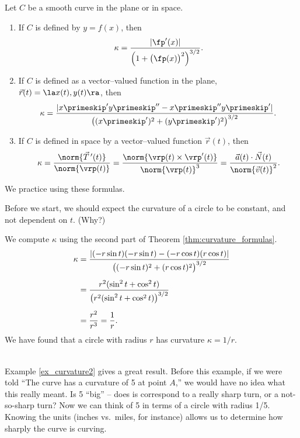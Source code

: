 {Let $C$ be a smooth curve  in the plane or in space.
\begin{enumerate}
	\item If $C$ is defined by $y=f(x)$, then 
	\[
	\kappa = \frac{\lvert\fp'(x)\rvert}{\Big(1+\big(\fp(x)\big)^2\Big)^{3/2}}.
	\]
	\item	If $C$ is defined as a vector--valued function in the plane, $\vec r(t) = \la x(t), y(t)\ra$, then
	\[
	\kappa = \frac{\lvert x\primeskip'y\primeskip''-x\primeskip''y\primeskip'\rvert}{\big((x\primeskip')^2+(y\primeskip')^2\big)^{3/2}}.
	\]
	\item If $C$ is defined in space by a vector--valued function $\vec r(t)$, then
\[
\kappa = \frac{\norm{\vec T\,'(t)}}{\norm{\vrp(t)}} = \frac{\norm{\vrp(t)\times\vrp'(t)}}{\norm{\vrp(t)}^3} = \frac{\vec a(t)\cdot \vec N(t)}{\norm{\vec v(t)}^2}.
\]
\end{enumerate}
}

We practice using these formulas.\\

{Before we start, we should expect the curvature of a circle to be constant, and not dependent on $t$. (Why?)

We compute $\kappa$ using the second part of Theorem \ref{thm:curvature_formulas}.
\begin{align*}
\kappa &= \frac{\lvert(-r\sin t)(-r\sin t) - (-r\cos t)(r\cos t)\rvert}{\big( (-r\sin t)^2+(r\cos t)^2\big)^{3/2}} \\
			&= \rule{0pt}{20pt}\frac{r^2(\sin^2t+\cos^2t)}{\big(r^2(\sin^2t+\cos^2t)\big)^{3/2}}\\
			&= \rule{0pt}{20pt}\frac{r^2}{r^3} = \frac1r.
\end{align*}
We have found that a circle with radius $r$ has curvature $\kappa = 1/r$.
}\\

Example \ref{ex_curvature2} gives a great result. Before this example, if we were told ``The curve has a curvature of 5 at point $A$,'' we would have no idea what this really meant. Is 5 ``big'' -- does is correspond to a really sharp turn, or a not-so-sharp turn? Now we can think of 5 in terms of a circle with radius 1/5. Knowing the units (inches vs.\ miles, for instance) allows us to determine how sharply the curve is curving.
\\

